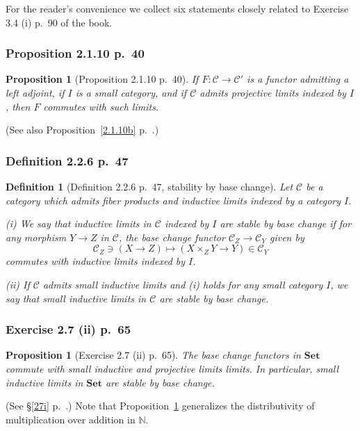 \documentclass[12pt]{article}
\newtheorem{prop}[thm]{Proposition}
\newtheorem{df}[thm]{Definition}
\theoremstyle{remark}
\theoremstyle{definition}
\newcommand{\nn}{\noindent}
\newcommand{\bb}{\mathbb}
\newcommand{\C}{\mathcal C}
\newcommand{\Set}{\mathbf{Set}}
\begin{document}
For the reader's convenience we collect six statements closely related to Exercise 3.4 (i) p.~90 of the book. 

\subsubsection{Proposition 2.1.10 p.~40}

\begin{prop}[Proposition 2.1.10 p.~40]\label{2.1.10}
If $F:\C\to\C'$ is a functor admitting a left adjoint, if $I$ is a small category, and if $\C$ admits projective limits indexed by $I$, then $F$ commutes with such limits.
\end{prop}

(See also Proposition~\ref{2.1.10b} p.~\pageref{2.1.10b}.)

\subsubsection{Definition 2.2.6 p.~47}

\begin{df}[Definition 2.2.6 p.~47, stability by base change]\label{dsbc}
Let $\C$ be a category which admits fiber products and inductive limits indexed by a category $I$.

\nn\emph{(i)} We say that inductive limits in $\C$ indexed by $I$ are \emph{stable by base change} if for any morphism $Y\to Z$ in $\C$, the base change functor $\C_Z\to\C_Y$ given by 
$$
\C_Z\ni(X\to Z)\mapsto(X\times_ZY\to Y)\in\C_Y
$$ 
commutes with inductive limits indexed by $I$.

\nn\emph{(ii)} If $\C$ admits small inductive limits and \emph{(i)} holds for any small category $I$, we say that \emph{small inductive limits in $\C$ are stable by base change}.
\end{df}

\subsubsection{Exercise 2.7 (ii) p.~65}

\begin{prop}[Exercise 2.7 (ii) p.~65]\label{sbcs}
The base change functors in $\Set$ commute with small inductive and projective limits limits. In particular, small inductive limits in $\Set$ are stable by base change.
\end{prop}

(See \S\ref{27i} p.~\pageref{27i}.) Note that Proposition~\ref{sbcs} generalizes the distributivity of multiplication over addition in $\bb N$.
\end{document}
